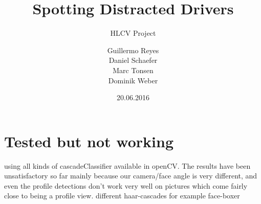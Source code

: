 \documentclass{beamer}
\title{Spotting Distracted Drivers}
\subtitle{HLCV Project}
\author[Reyes, Schaefer, Tonsen, Weber]{Guillermo Reyes \\
	 Daniel Schaefer \\
	 Marc Tonsen \\
 Dominik Weber\\}
\institute[]{Saarland University}
\date{20.06.2016}
\begin{document}
	\begin{frame}
		\titlepage
	\end{frame}
	
	
	\section{Tested but not working}	
    using all kinds of cascadeClassifier available in openCV. The results have been unsatisfactory so far mainly because our camera/face angle is very different, and even the profile detections don't work very well on pictures which come fairly close to being a profile view.  
    different haar-cascades for example face-boxer

	
	
\end{document}
